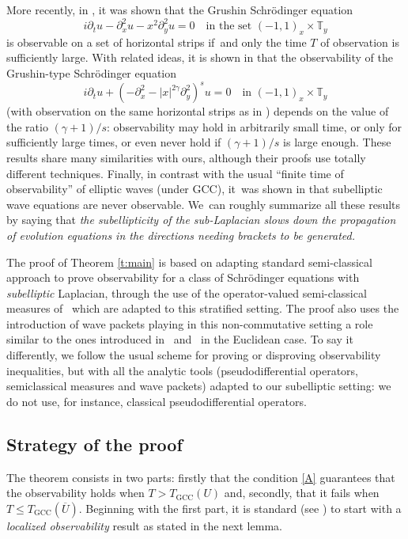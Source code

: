 \documentclass[JEP,XML,SOM,Unicode,published]{cedram}
\newcommand{\GCC}{\mathrm{GCC}}
\theoremstyle{plain}
\theoremstyle{definition}
\def\T{{\mathbb T}}
\begin{document}
More recently, in \cite{BS}, it was shown that the Grushin Schrödinger equation
\[
i\partial_{t}u-\partial_{x}^2u-x^2\partial_{y}^2u=0\quad \text{in the set }(-1,1)_x\times \T_y
\]
is observable on a set of horizontal strips if~and only the time $T$ of observation is sufficiently large. With related ideas, it is shown in \cite{LS} that the observability of the Grushin-type Schrödinger equation
\[
i\partial_{t}u+(-\partial_{x}^2-|x|^{2\gamma}\partial_{y}^2)^su=0\quad \text{in }(-1,1)_x\times \T_y
\]
(with observation on the same horizontal strips as in \cite{BS}) depends on the value of the ratio $(\gamma+1)/s$: observability may hold in arbitrarily small time, or only for sufficiently large times, or even never hold if $(\gamma+1)/s$ is large enough. These results share many similarities with ours, although their proofs use totally different techniques. Finally, in contrast with the usual ``finite time of observability'' of elliptic waves (under GCC), it~was shown in \cite{Let} that subelliptic wave equations are never observable.
We~can roughly summarize all these results by saying that \emph{the subellipticity of the sub-Laplacian slows down the propagation of evolution equations in the directions needing brackets to be generated.}

The proof of Theorem \ref{t:main} is based on adapting standard semi-classical approach to prove observability for a class of Schrödinger equations with \emph{subelliptic} Laplacian, through the use of the operator-valued semi-classical measures of~\cite{FF} which are adapted to this stratified setting. The proof also uses the introduction of wave packets playing in this non-commutative setting a role similar to the ones introduced in~\cite{CR} and~\cite{hag} in the Euclidean case. To say it differently, we follow the usual scheme for proving or disproving observability inequalities, but with all the analytic tools (\hbox{\ie pseudodifferential} operators, semiclassical measures and wave packets) adapted to our subelliptic setting: we do not use, for instance, classical pseudodifferential operators.

\subsection{Strategy of the proof}
The theorem consists in two parts: firstly that the condition \eqref{A} guarantees that the observability holds when $T>T_\GCC(U)$ and, secondly, that it fails when~$T\leq T_\GCC(\overline{U})$. Beginning with the first part,
it is standard (see \cite{Leb}) to start with a \emph{localized observability} result as stated in the next lemma.
\end{document}

